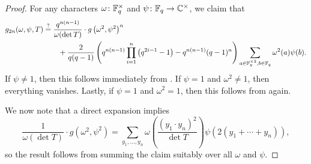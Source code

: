 \begin{proof}
    For any characters $\omega\colon\mathbb F_q^\times$ and $\psi\colon\mathbb F_q\to\mathbb C^\times$, we claim that
    \begin{align*}
        g_{2n}(\omega,\psi,T) &\stackrel?= \frac{q^{n(n-1)}}{\omega(\det T)}\cdot g\left(\omega^2,\psi^2\right)^n \\
        &\qquad+\frac 2{q(q-1)}
        \left(q^{n(n-1)}\prod_{i=1}^{n}\left(q^{2i-1}-1\right)-q^{n(n-1)}(q-1)^n\right)\sum_{a\in\mathbb F_q^{\times2},b\in\mathbb F_q}\omega^2(a)\psi(b).
    \end{align*}
    If $\psi\ne1$, then this follows immediately from . If $\psi=1$ and $\omega^2\ne1$, then everything vanishes. Lastly, if $\psi=1$ and $\omega^2=1$, then this follows from  again.

    We now note that a direct expansion implies
    \[\frac1{\omega(\det T)}\cdot g\left(\omega^2,\psi^2\right)=\sum_{y_1,\ldots,y_n}\omega\left(\frac{(y_1\cdot y_n)^2}{\det T}\right)\psi(2(y_1+\cdots+y_n)),\]
    so the result follows from summing the claim suitably over all $\omega$ and $\psi$.
\end{proof}




